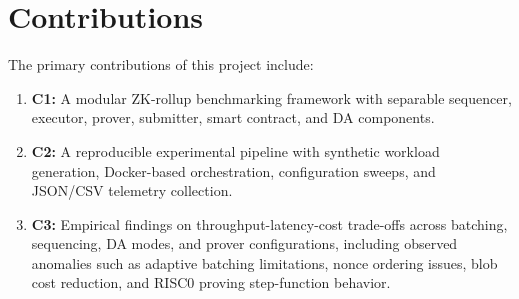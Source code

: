 \section{Contributions}
\label{sec:intro_contributions}

The primary contributions of this project include:
\begin{enumerate}
    \item \textbf{C1:} A modular ZK-rollup benchmarking framework with separable sequencer, executor, prover, submitter, smart contract, and DA components.
    \item \textbf{C2:} A reproducible experimental pipeline with synthetic workload generation, Docker-based orchestration, configuration sweeps, and JSON/CSV telemetry collection.
    \item \textbf{C3:} Empirical findings on throughput-latency-cost trade-offs across batching, sequencing, DA modes, and prover configurations, including observed anomalies such as adaptive batching limitations, nonce ordering issues, blob cost reduction, and RISC0 proving step-function behavior.
\end{enumerate}
